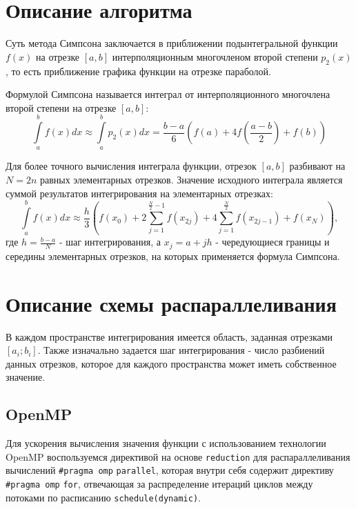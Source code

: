 \documentclass{report}
\begin{document}
\section*{Описание алгоритма}
Суть метода Симпсона заключается в приближении подынтегральной функции $f(x)$ на отрезке $[a, b]$ интерполяционным многочленом второй степени $p_{2}(x)$, то есть приближение графика функции на отрезке параболой.
\par Формулой Симпсона называется интеграл от интерполяционного многочлена второй степени на отрезке $[a, b]$:
$$
    \int\limits_a^b {f(x) dx} \approx \int\limits_a^b {p_2(x) dx} = \frac{b - a}{6} \left( f(a) + 4f \left( \frac{a - b}{2} \right) + f(b) \right)
$$
\par Для более точного вычисления интеграла функции, отрезок $[a, b]$ разбивают на $N = 2n$ равных элементарных отрезков. Значение исходного интеграла является суммой результатов интегрирования на элементарных отрезках:
$$
    \int\limits_a^b {f(x) dx} \approx \frac{h}{3} \left( f(x_0) + 2 \sum_{j = 1}^{\frac{N}{2} - 1} f(x_{2j}) + 4 \sum_{j = 1}^{\frac{N}{2}} f(x_{2j - 1})+ f(x_N) \right) ,
$$
где $h = \frac{b - a}{N}$ - шаг интегрирования, а $x_j = a + jh$ - чередующиеся границы и середины элементарных отрезков, на которых применяется формула Симпсона.
\newpage

\section*{Описание схемы распараллеливания}
В каждом пространстве интегрирования имеется область, заданная отрезками $[a_i; b_i]$. Также изначально задается шаг интегрирования - число разбиений данных отрезков, которое для каждого пространства может иметь собственное значение.

\subsection*{OpenMP}
\par Для ускорения вычисления значения функции с использованием технологии OpenMP воспользуемся директивой на основе \verb|reduction| для распараллеливания вычислений \verb|#pragma omp| \verb|parallel|, которая внутри себя содержит директиву \verb|#pragma omp| \verb|for|, отвечающая за распределение итераций циклов между потоками по расписанию \verb|schedule(dynamic)|.
\end{document}
